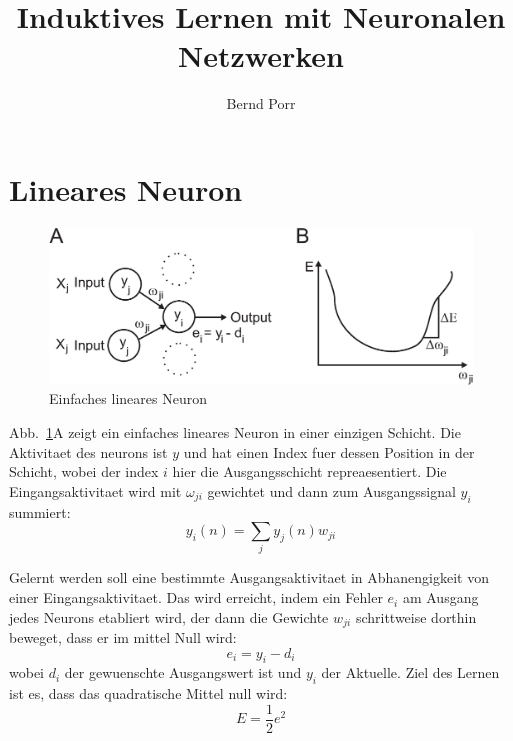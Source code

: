 \documentclass[12pt]{article}
\author{Bernd Porr}
\title{Induktives Lernen mit Neuronalen Netzwerken}
\begin{document}
\maketitle

\section{Lineares Neuron}

\begin{figure}[!hbt]
\begin{center}
\mbox{\includegraphics[width=\textwidth]{one_layer}}
\end{center}
\caption{Einfaches lineares Neuron
\label{one_layer}}
\end{figure}

Abb.~\ref{one_layer}A zeigt ein einfaches lineares Neuron in einer
einzigen Schicht. Die Aktivitaet des neurons ist $y$ und hat einen
Index fuer dessen Position in der Schicht, wobei der index $i$ hier
die Ausgangsschicht repreaesentiert. Die Eingangsaktivitaet wird mit
$\omega_{ji}$ gewichtet und dann zum Ausgangssignal $y_i$ summiert:
\begin{equation}
  y_i(n) = \sum_j y_j(n) w_{ji} \label{linear_sum}
\end{equation}

Gelernt werden soll eine bestimmte Ausgangsaktivitaet in Abhanengigkeit von einer Eingangsaktivitaet.
Das wird erreicht, indem ein Fehler $e_i$ am Ausgang jedes Neurons etabliert wird, der dann die Gewichte $w_{ji}$
schrittweise dorthin beweget, dass er im mittel Null wird:
\begin{equation}
  e_i = y_i - d_i \label{output_error}
\end{equation}
wobei $d_i$ der gewuenschte Ausgangswert ist und $y_i$ der Aktuelle.
Ziel des Lernen ist es, dass das quadratische Mittel null wird:
\begin{equation}
  E = \frac{1}{2} e^2
\end{equation}
\end{document}

